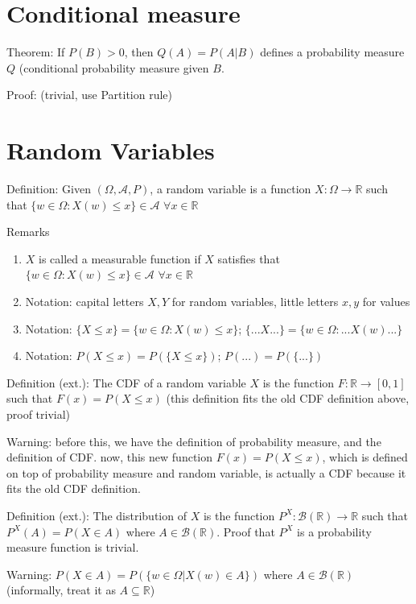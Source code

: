 \documentclass[12pt]{article}
\newcommand{\A}{\mathcal{A}}
\newcommand{\B}{\mathcal{B}}
\begin{document}
\section{Conditional measure}

Theorem: If $P(B)>0$, then $Q(A)=P(A|B)$ defines a probability measure $Q$ (conditional
probability measure given $B$.

Proof: (trivial, use Partition rule)

\section{Random Variables}

Definition: Given $(\Omega, \A, P)$, a random variable is a function $X:\Omega \rightarrow \mathbb{R}$
such that $\{w\in \Omega: X(w)\le x\} \in \A$ $\forall x\in \mathbb{R}$
\bigbreak

Remarks
\begin{enumerate}
    \item $X$ is called a measurable function if $X$ satisfies that $\{w\in \Omega: X(w)\le x\} \in \A$ $\forall x\in \mathbb{R}$
    \item Notation: capital letters $X, Y$ for random variables, little letters $x,y$ for values
    \item Notation: $\{X\le x\}=\{w\in\Omega:X(w)\le x\}$; $\{...X...\}=\{w\in\Omega:...X(w)...\}$
    \item Notation: $P(X\le x)=P(\{X\le x\})$; $P(...)=P(\{...\})$
\end{enumerate}
\bigbreak

Definition (ext.): The CDF of a random variable $X$ is the function $F:\mathbb{R}\rightarrow [0,1]$
such that $F(x)=P(X\le x)$ (this definition fits the old CDF definition above, proof trivial)

Warning: before this, we have the definition of probability measure, and the definition
of CDF. now, this new function $F(x)=P(X\le x)$, which is defined on top of probability measure
and random variable,
is actually a CDF because it fits the old CDF definition. 
\bigbreak

Definition (ext.): The distribution of $X$ is the function $P^X: \B(\mathbb{R})\rightarrow \mathbb{R}$
such that $P^{X}(A)=P(X\in A)$ where $A\in \B(\mathbb{R})$. Proof that $P^X$ is a
probability measure function is trivial.
\bigbreak

Warning: $P(X\in A)=P(\{w\in\Omega | X(w)\in A\})$ where $A\in \mathcal{B}(\mathbb{R})$ (informally,
treat it as $A\subseteq \mathbb{R}$)
\bigbreak
\end{document}
